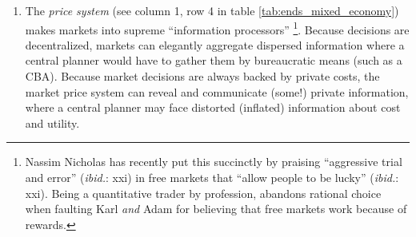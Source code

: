 \begin{enumerate}
	\item The \emph{price system} (see column 1, row 4 in table \ref{tab:ends_mixed_economy}) makes markets into supreme ``information processors'' \citep{Hayek1931}\footnote{
		Nassim Nicholas \cite{Taleb2007} has recently put this succinctly by praising ``aggressive trial and error'' (\emph{ibid.}: xxi) in free markets that ``allow people to be lucky'' (\emph{ibid.}: xxi). Being a quantitative trader by profession, \cite{Taleb2007} abandons rational choice when faulting Karl \cite{Marx-1867-aa} \emph{and} Adam \cite{Smith-1776-lq} for believing that free markets work because of rewards.}. 
	Because decisions are decentralized, markets can elegantly aggregate dispersed information where a central planner would have to gather them by bureaucratic means (such as a \gls{CBA}). Because market decisions are always backed by private costs, the market price system can reveal and communicate (some!) private information, where a central planner may face distorted (inflated) information about cost and utility.
\end{enumerate}

